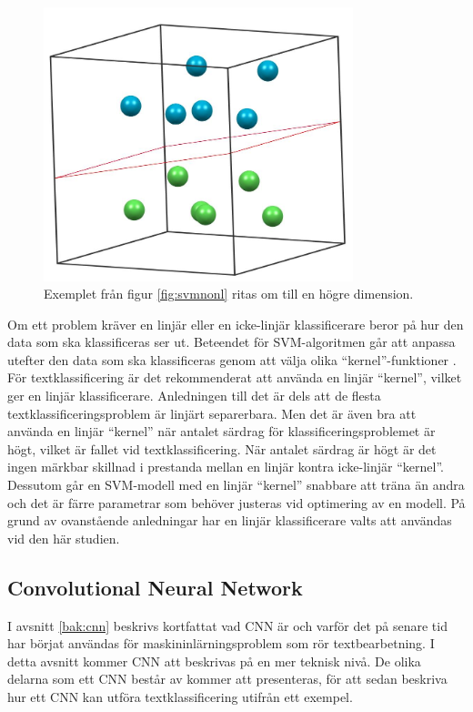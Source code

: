 \documentclass{kaumasters} %
\begin{document}
\begin{figure}[H]
\includegraphics[width=9cm]{svm_3d}
\centering
\caption{Exemplet från figur \ref{fig:svmnonl} ritas om till en högre dimension.}
\label{fig:svm3d}
\end{figure} 

Om ett problem kräver en linjär eller en icke-linjär klassificerare beror på hur den data som ska klassificeras ser ut. Beteendet för SVM-algoritmen går att anpassa utefter den data som ska klassificeras genom att välja olika “kernel”-funktioner \cite{svm:006}. För textklassificering är det rekommenderat att använda en linjär “kernel”, vilket ger en linjär klassificerare. Anledningen till det är dels att de flesta textklassificeringsproblem är linjärt separerbara. Men det är även bra att använda en linjär “kernel” när antalet särdrag för klassificeringsproblemet är högt, vilket är fallet vid textklassificering. När antalet särdrag är högt är det ingen märkbar skillnad i prestanda mellan en linjär kontra icke-linjär “kernel”. Dessutom går en SVM-modell med en linjär “kernel” snabbare att träna än andra och det är färre parametrar som behöver justeras vid optimering av en modell. 
På grund av ovanstående anledningar har en linjär klassificerare valts att användas vid den här studien. 


\subsection{Convolutional Neural Network} \label{exp:cnn}
I avsnitt \ref{bak:cnn} beskrivs kortfattat vad CNN är och varför det på senare tid har börjat användas för maskininlärningsproblem som rör textbearbetning. I detta avsnitt kommer CNN att beskrivas på en mer teknisk nivå. De olika delarna som ett CNN består av kommer att presenteras, för att sedan beskriva hur ett CNN kan utföra textklassificering utifrån ett exempel. 
\end{document}
